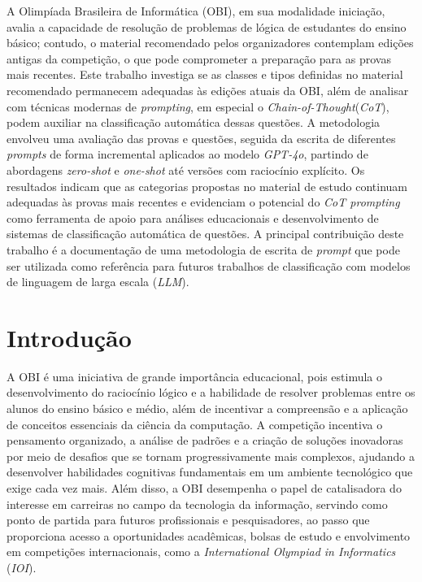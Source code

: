\documentclass[12pt]{article}
\begin{document}
\vspace{-11pt}
\begin{resumo}
    A Olimpíada Brasileira de Informática (OBI), em sua modalidade iniciação, avalia a capacidade de resolução de problemas de lógica de estudantes do ensino básico; contudo, o material recomendado pelos organizadores contemplam edições antigas da competição, o que pode comprometer a preparação para as provas mais recentes. Este trabalho investiga se as classes e tipos definidas no material recomendado permanecem adequadas às edições atuais da OBI, além de analisar com técnicas modernas de \textit{prompting}, em especial o \textit{Chain-of-Thought}(\textit{CoT}), podem auxiliar na classificação automática dessas questões. A metodologia envolveu uma avaliação das provas e questões, seguida da escrita de diferentes \textit{prompts} de forma incremental aplicados ao modelo \textit{GPT-4o}, partindo de abordagens \textit{zero-shot} e \textit{one-shot} até versões com raciocínio explícito. Os resultados indicam que as categorias propostas no material de estudo continuam adequadas às provas mais recentes e evidenciam o potencial do \textit{CoT prompting} como ferramenta de apoio para análises educacionais e desenvolvimento de sistemas de classificação automática de questões. A principal contribuição deste trabalho é a documentação de uma metodologia de escrita de \textit{prompt} que pode ser utilizada como referência para futuros trabalhos de classificação com modelos de linguagem de larga escala (\textit{LLM}).
\end{resumo}


\section{Introdução}\label{sec:intro}

A OBI \cite{misc1} é uma iniciativa de grande importância educacional, pois estimula o desenvolvimento do raciocínio lógico e a habilidade de resolver problemas entre os alunos do ensino básico e médio, além de incentivar a compreensão e a aplicação de conceitos essenciais da ciência da computação. A competição incentiva o pensamento organizado, a análise de padrões e a criação de soluções inovadoras por meio de desafios que se tornam progressivamente mais complexos, ajudando a desenvolver habilidades cognitivas fundamentais em um ambiente tecnológico que exige cada vez mais. Além disso, a OBI desempenha o papel de catalisadora do interesse em carreiras no campo da tecnologia da informação, servindo como ponto de partida para futuros profissionais e pesquisadores, ao passo que proporciona acesso a oportunidades acadêmicas, bolsas de estudo e envolvimento em competições internacionais, como a \textit{International Olympiad in Informatics} (\textit{IOI}).
\end{document}
